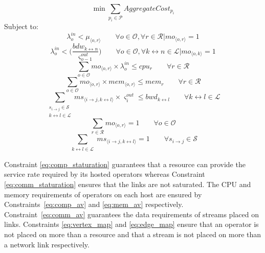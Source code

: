 \begin{equation}
  \min \sum\limits_{p_i\in\mathcal{P}}{AggregateCost_{p_i}}
  \label{eq:objectivefunction}
\end{equation}
Subject to:
\begin{equation}
  \lambda_{o}^{in} < \mu_{\langle o,r\rangle} \quad\quad \forall o\in\mathcal{O}, \forall r\in\mathcal{R} | mo_{\langle o,r\rangle} = 1  
  \label{eq:comp_staturation}
\end{equation}
\begin{equation}
  \lambda_{o}^{in}<\Big(\frac{bdw_{k\leftrightarrow n}}{\varsigma_{o-1}^{out}}\Big) \quad\quad  \forall o\in\mathcal{O}, \forall k\!\leftrightarrow\!n\in\mathcal{L} |  mo_{\langle o,k\rangle} = 1 
    \label{eq:comm_staturation}
\end{equation}
\begin{equation}
 \sum_{o\in\mathcal{O}}mo_{\langle o,r\rangle}\times\lambda_{o}^{in} \le cpu_r \quad\quad \forall r\in\mathcal{R}
  \label{eq:comp_av}
\end{equation}
\begin{equation}
\sum _{o \in \mathcal{O}}
{
mo_{\langle o,r\rangle} \times mem_{\langle o,r\rangle} \le mem_{r} \quad\quad \forall r\in\mathcal{R}
}
   \label{eq:mem_av}
\end{equation}
\begin{equation}
 \sum\limits_{
 \substack{s_{i\rightarrow j}\in\mathcal{S}\\
 k \leftrightarrow l\in\mathcal{L}
 }
 }{
    ms_{\langle i\rightarrow j,k\leftrightarrow l\rangle} \times \varsigma_i^{out} \le bwd_{k \leftrightarrow l} \quad\quad \forall k \leftrightarrow l\in\mathcal{L}
 }
   \label{eq:comm_av}
\end{equation}
\begin{equation}
 \displaystyle \sum _{r \in \mathcal{R}} mo_{\langle o,r\rangle} = 1 \quad\quad \forall o \in \mathcal{O}
 \label{eq:vertex_map}
\end{equation}
\begin{equation}
 \sum\limits_{
 \substack{
 k\leftrightarrow l \in \mathcal{L}}}
 {
 ms_{\langle i\rightarrow j,k\leftrightarrow l\rangle} = 1 \quad\quad \forall s_{i\rightarrow j} \in \mathcal{S}
 }
  \label{eq:edge_map}
\end{equation}

Constraint \ref{eq:comp_staturation} guarantees that a resource can provide the service rate required by its hosted operators whereas Constraint \ref{eq:comm_staturation} ensures that the links are not saturated. The CPU and memory requirements of operators on each host are ensured by Constraints~\ref{eq:comp_av} and \ref{eq:mem_av} respectively. Constraint~\ref{eq:comm_av} guarantees the data requirements of streams placed on links. Constraints \ref{eq:vertex_map} and \ref{eq:edge_map} ensure that an operator is not placed on more than a resource and that a stream is not placed on more than a network link respectively.

